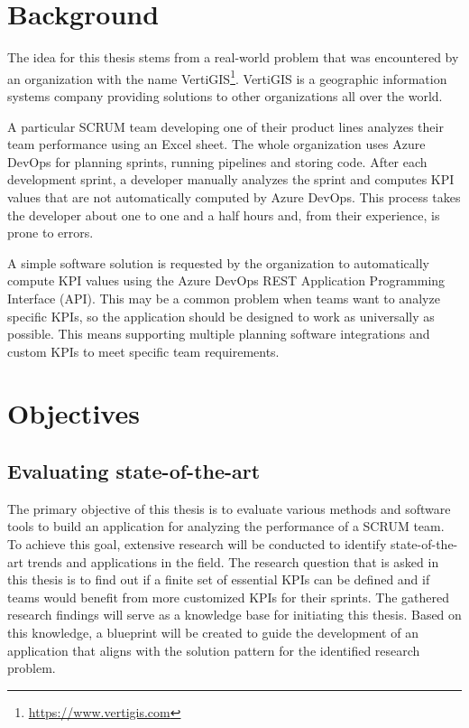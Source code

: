 \section{Background}\label{background-section}

The idea for this thesis stems from a real-world problem that was encountered by an 
organization with the name VertiGIS\footnote{\url{https://www.vertigis.com}}. 
VertiGIS is a geographic information systems company
providing solutions to other organizations all over the world.

A particular SCRUM team developing one of their product
lines analyzes their team performance using an Excel sheet. 
The whole organization uses Azure DevOps for planning sprints, running pipelines and storing code.
After each development sprint, a developer manually analyzes the sprint and computes KPI values
that are not automatically computed by Azure DevOps.
This process takes the developer about one to one and a half hours and, from their experience, is prone to errors.

A simple software solution is requested by the organization to automatically compute KPI values using the 
Azure DevOps REST Application Programming Interface (API).
This may be a common problem when teams want to analyze specific KPIs, so the application should be 
designed to work as universally as possible. 
This means supporting multiple planning software integrations and custom KPIs to meet specific team requirements.

\section{Objectives} \label{Chapter1-Objectives}

\subsection{Evaluating state-of-the-art}

The primary objective of this thesis is to evaluate various methods and software tools to 
build an application for analyzing the performance of a SCRUM team.
To achieve this goal, extensive research will be conducted to identify 
state-of-the-art trends and applications in the field. 
The research question that is asked in this thesis is to find out if a finite set of essential KPIs can be defined and if teams would benefit from more customized KPIs for their sprints.
The gathered research findings will serve as a knowledge base for initiating this thesis. 
Based on this knowledge, a blueprint will be created to guide the development 
of an application that aligns with the solution pattern for the identified research problem.


